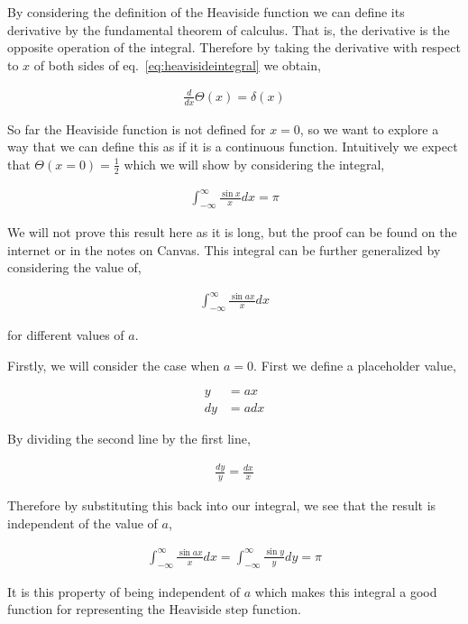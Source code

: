 \documentclass[11pt]{amsart}
\begin{document}
By considering the definition of the Heaviside function we can define its derivative by the fundamental theorem of calculus. That is, the derivative is the opposite operation of the integral. Therefore by taking the derivative with respect to $x$ of both sides of eq.~\ref{eq:heavisideintegral} we obtain,

\begin{align*}
  \frac{d}{dx}\Theta(x) = \delta(x)
\end{align*}

So far the Heaviside function is not defined for $x = 0$, so we want to explore a way that we can define this as if it is a continuous function. Intuitively we expect that $\Theta(x = 0) = \frac{1}{2}$ which we will show by considering the integral,

\begin{align*}
  \int_{-\infty}^{\infty} \frac{\sin x}{x} dx = \pi
\end{align*}

We will not prove this result here as it is long, but the proof can be found on the internet or in the notes on Canvas. This integral can be further generalized by considering the value of,

\begin{align*}
  \int_{-\infty}^{\infty} \frac{\sin ax}{x} dx
\end{align*}

for different values of $a$.

Firstly, we will consider the case when $a = 0$. First we define a placeholder value,

\begin{align*}
  y &= ax \\
  dy &= adx
\end{align*}

By dividing the second line by the first line,

\begin{align*}
  \frac{dy}{y} = \frac{dx}{x}
\end{align*}

Therefore by substituting this back into our integral, we see that the result is independent of the value of $a$,

\begin{align*}
   \int_{-\infty}^{\infty} \frac{\sin ax}{x} dx = \int_{-\infty}^{\infty} \frac{\sin y}{y} dy = \pi
\end{align*}

It is this property of being independent of $a$ which makes this integral a good function for representing the Heaviside step function.
\end{document}
